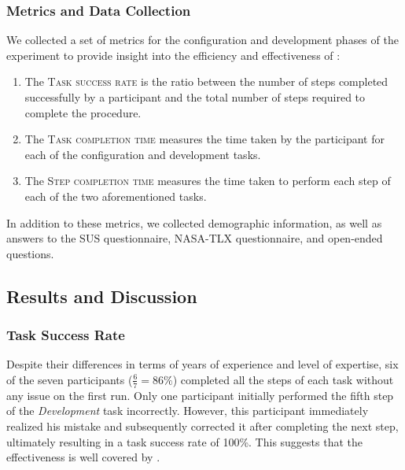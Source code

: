 \subsubsection{Metrics and Data Collection}
We collected a set of metrics for the configuration and development phases of the experiment to provide insight into the efficiency and effectiveness of \ql:
\begin{enumerate}
    \item The \textsc{Task success rate} is the ratio between the number of steps completed successfully by a participant and the total number of steps required to complete the procedure.
    \item The \textsc{Task completion time} measures the time taken by the participant for each of the configuration and development tasks.
    \item The \textsc{Step completion time} measures the time taken to perform each step of each of the two aforementioned tasks.
\end{enumerate}
In addition to these metrics, we collected demographic information, as well as answers to the SUS questionnaire, NASA-TLX questionnaire, and open-ended questions.

\subsection{Results and Discussion} \label{sec:quantumleap:evaluation:results}

\subsubsection{Task Success Rate}
Despite their differences in terms of years of experience and level of expertise, six of the seven participants ($\frac{6}{7}{=}86\%$) completed all the steps of each task without any issue on the first run. Only one participant initially performed the fifth step of the \textit{Development} task incorrectly. However, this participant immediately realized his mistake and subsequently corrected it after completing the next step, ultimately resulting in a task success rate of 100\%. This suggests that the effectiveness is well covered by \ql.

